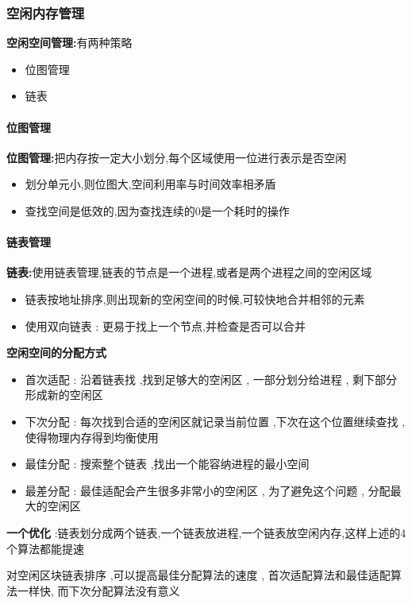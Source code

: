 \documentclass[UTF8,a4paper]{ctexart}
\begin{document}
\subsubsection{空闲内存管理}
\textbf{空闲空间管理:}有两种策略
\begin{itemize}
	\item 位图管理
	\item 链表
\end{itemize}

\paragraph{位图管理}
\textbf{位图管理:}把内存按一定大小划分,每个区域使用一位进行表示是否空闲
\begin{itemize}
	\item 划分单元小,则位图大,空间利用率与时间效率相矛盾
	\item 查找空间是低效的,因为查找连续的0是一个耗时的操作
\end{itemize}

\paragraph{链表管理}
\textbf{链表:}使用链表管理,链表的节点是一个进程,或者是两个进程之间的空闲区域
\begin{itemize}
	\item 链表按地址排序,则出现新的空闲空间的时候,可较快地合并相邻的元素
	\item 使用双向链表 : 更易于找上一个节点,并检查是否可以合并
\end{itemize}

\textbf{空闲空间的分配方式}
\begin{itemize}
	\item 首次适配 : 沿着链表找 ,找到足够大的空闲区 , 一部分划分给进程 , 剩下部分形成新的空闲区

	\item 下次分配 : 每次找到合适的空闲区就记录当前位置 ,下次在这个位置继续查找 , 使得物理内存得到均衡使用
	\item 最佳分配 : 搜索整个链表 ,找出一个能容纳进程的最小空间
	\item 最差分配 : 最佳适配会产生很多非常小的空闲区 , 为了避免这个问题 , 分配最大的空闲区
\end{itemize}

\textbf{一个优化}  :链表划分成两个链表,一个链表放进程,一个链表放空闲内存,这样上述的4个算法都能提速

对空闲区块链表排序 ,可以提高最佳分配算法的速度 , 首次适配算法和最佳适配算法一样快, 而下次分配算法没有意义
\end{document}
